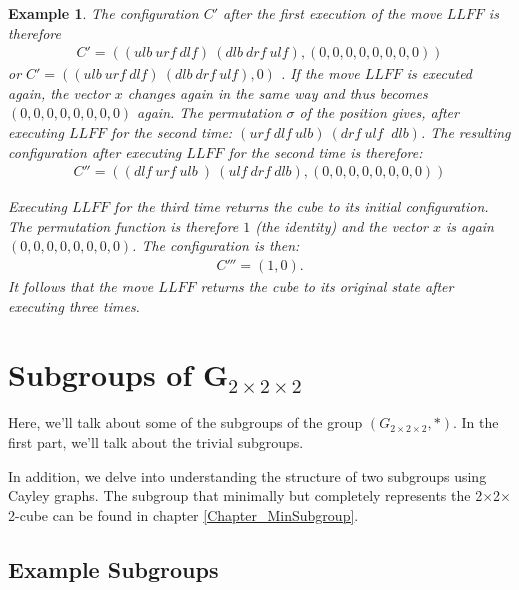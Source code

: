 \documentclass[12pt,a4paper]{article}
\theoremstyle{custom}
\newtheorem*{example}{Example}
\newcommand{\Gtwo}{\ensuremath{G_{2\times 2\times 2}}}
\newcommand{\Ttwo}{2$\times$2$\times$2-}
\begin{document}
\begin{example}
The configuration $C'$ after the first execution of the  move $LLFF$ is therefore
\begin{align*}
C' = ((\textit{ulb} \ \textit{urf} \ \textit{dlf} )\ ( \textit{dlb} \ \textit{drf} \ \textit{ulf} ),(0,0,0,0,0,0,0,0))
\end{align*} 
or  $C' = ((\textit{ulb} \ \textit{urf} \ \textit{dlf} ) \ (\textit{dlb} \ \textit{drf} \ \textit{ulf} ),0)$ . If the move $LLFF$ is executed again, the vector $x$ changes again in the same way and thus becomes $(0,0,0,0,0,0,0,0)$ again. The permutation $\sigma$ of the position gives, after executing $LLFF$ for the second time: $(\textit{urf} \ \textit{dlf} \ \textit{ulb}) \ ( \textit{drf} \ \textit{ulf } \ \textit{dlb} )$. The resulting configuration after executing $LLFF$ for the second time is therefore:
\begin{align*}
C'' = (( \textit{dlf} \ \textit{urf} \ \textit{ulb} \ ) \ ( \textit{ulf} \ \textit{drf} \ \textit{dlb} ),(0,0 ,0,0,0,0,0,0))
\end{align*}

Executing $LLFF$ for the third time returns the cube to its initial configuration. The permutation function is therefore $1$ (the identity) and the vector $x$ is again $(0,0,0,0,0,0,0,0)$. The configuration is then:
\begin{align*}
C''' = (1,0).
\end{align*}
It follows that the move $LLFF$ returns the cube to its original state after executing three times.
\end{example}



\newpage
\section{Subgroups of G$_{2\times 2\times 2}$}


\label{Chapters_Subgroups}

Here, we'll talk about some of the subgroups of the group $\left(\Gtwo, \scriptstyle*\right)$. In the first part, we'll talk about the trivial subgroups.

In addition,  we delve into understanding the structure of two subgroups using  Cayley graphs. The subgroup that minimally but completely represents the \Ttwo cube can be found in chapter \ref{Chapter_MinSubgroup}.

\subsection{Example Subgroups}
\label{Section_SubgroupExamples}
\end{document}
